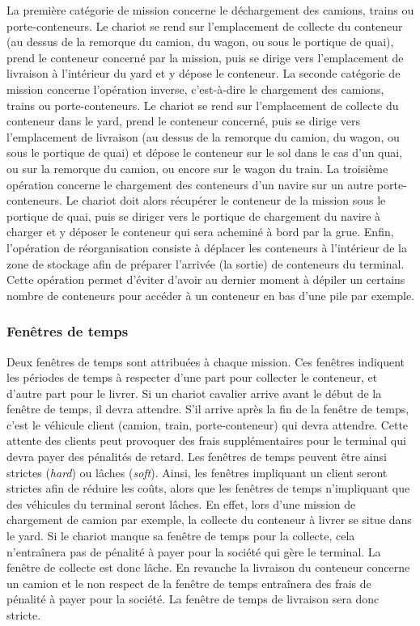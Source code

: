 La première catégorie de mission concerne le déchargement des camions, trains ou porte-conteneurs. Le chariot se rend sur l'emplacement de collecte du conteneur (au dessus de la remorque du camion, du wagon, ou sous le portique de quai), prend le conteneur concerné par la mission, puis se dirige vers l'emplacement de livraison à l'intérieur du yard et y dépose le conteneur.
La seconde catégorie de mission concerne l'opération inverse, c'est-à-dire le chargement des camions, trains ou porte-conteneurs. Le chariot se rend sur l'emplacement de collecte du conteneur dans le yard, prend le conteneur concerné, puis se dirige vers l'emplacement de livraison (au dessus de la remorque du camion, du wagon, ou sous le portique de quai) et dépose le conteneur sur le sol dans le cas d'un quai, ou sur la remorque du camion, ou encore sur le wagon du train.
La troisième opération concerne le chargement des conteneurs d'un navire sur un autre porte-conteneurs. Le chariot doit alors récupérer le conteneur de la mission sous le portique de quai, puis se diriger vers le portique de chargement du navire à charger et y déposer le conteneur qui sera acheminé à bord par la grue.
Enfin, l'opération de réorganisation consiste à déplacer les conteneurs à l'intérieur de la zone de stockage afin de préparer l'arrivée (la sortie) de conteneurs du terminal. Cette opération permet d'éviter d'avoir au dernier moment à dépiler un certains nombre de conteneurs pour accéder à un conteneur en bas d'une pile par exemple.

\subsubsection{Fenêtres de temps}

Deux fenêtres de temps sont attribuées à chaque mission. Ces fenêtres indiquent les périodes de temps à respecter d'une part pour collecter le conteneur, et d'autre part pour le livrer.
Si un chariot cavalier arrive avant le début de la fenêtre de temps, il devra attendre. S'il arrive après la fin de la fenêtre de temps, c'est le véhicule client (camion, train, porte-conteneur) qui devra attendre. Cette attente des clients peut provoquer des frais supplémentaires pour le terminal qui devra payer des pénalités de retard. Les fenêtres de temps peuvent être ainsi strictes (\textit{hard}) ou lâches (\textit{soft}). 
Ainsi, les fenêtres impliquant un client seront strictes afin de réduire les coûts, alors que les fenêtres de temps n'impliquant que des véhicules du terminal seront lâches. En effet, lors d'une mission de chargement de camion par exemple, la collecte du conteneur à livrer se situe dans le yard. Si le chariot manque sa fenêtre de temps pour la collecte, cela n'entraînera pas de pénalité à payer pour la société qui gère le terminal.
La fenêtre de collecte est donc lâche. En revanche la livraison du conteneur concerne un camion et le non respect de la fenêtre de temps entraînera des frais de pénalité à payer pour la société. La fenêtre de temps de livraison sera donc stricte.

